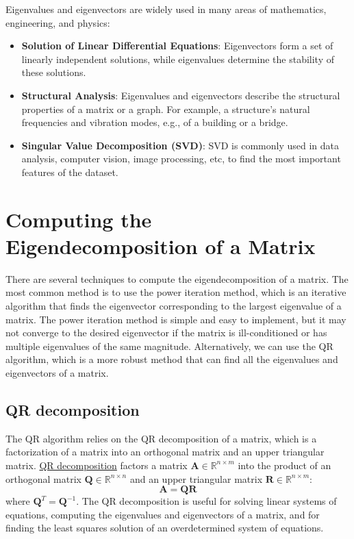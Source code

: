 \documentclass{article}[12pt]
\begin{document}
Eigenvalues and eigenvectors are widely used in many areas of mathematics, engineering, and physics:
\begin{itemize}
\item{\textbf{Solution of Linear Differential Equations}: Eigenvectors form a set of linearly independent solutions, while eigenvalues determine the stability of these solutions.}
\item{\textbf{Structural Analysis}: Eigenvalues and eigenvectors describe the structural properties of a matrix or a graph. For example, a structure's natural frequencies and vibration modes, e.g., of a building or a bridge.}
\item{\textbf{Singular Value Decomposition (SVD)}: SVD is commonly used in data analysis, computer vision, image processing, etc, to find the most important features of the dataset.}
\end{itemize}


\section{Computing the Eigendecomposition of a Matrix}
There are several techniques to compute the eigendecomposition of a matrix. 
The most common method is to use the power iteration method, which is an iterative algorithm that finds the eigenvector corresponding to the largest eigenvalue of a matrix.
The power iteration method is simple and easy to implement, but it may not converge to the desired eigenvector if the matrix is ill-conditioned or has multiple eigenvalues of the same magnitude.
Alternatively, we can use the QR algorithm, which is a more robust method that can find all the eigenvalues and eigenvectors of a matrix.

\subsection{QR decomposition}
The QR algorithm relies on the QR decomposition of a matrix, which is a factorization of a matrix into an orthogonal matrix and an upper triangular matrix.
\href{https://en.wikipedia.org/wiki/QR_decomposition}{QR decomposition} factors a matrix $\mathbf{A}\in\mathbb{R}^{n\times{m}}$ 
into the product of an orthogonal matrix $\mathbf{Q}\in\mathbb{R}^{n\times{n}}$ and 
an upper triangular matrix $\mathbf{R}\in\mathbb{R}^{n\times{m}}$:
\begin{equation}
\mathbf{A} = \mathbf{Q}\mathbf{R}
\end{equation}
where $\mathbf{Q}^{T} = \mathbf{Q}^{-1}$. 
The QR decomposition is useful for solving linear systems of equations, computing the eigenvalues and eigenvectors of a matrix, and for finding the least squares solution of an overdetermined system of equations.
\end{document}
